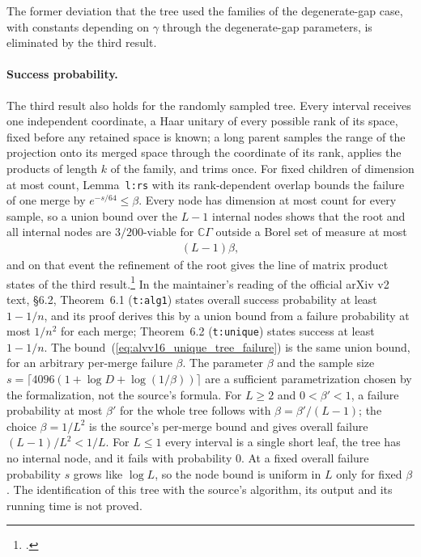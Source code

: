 \documentclass{article}
\begin{document}
The former deviation that the tree used the families of the degenerate-gap
case, with constants depending on $\gamma$ through the degenerate-gap
parameters, is eliminated by the third result.

\paragraph{Success probability.}
The third result also holds for the randomly sampled tree. Every interval
receives one independent coordinate, a Haar unitary of every possible rank
of its space, fixed before any retained space is known; a long parent
samples the range of the projection onto its merged space through the
coordinate of its rank, applies the products of length $k$ of the family,
and trims once. For fixed children of dimension at most $\mathrm{count}$,
Lemma~\texttt{l:rs} with its rank-dependent overlap bounds the failure of
one merge by $e^{-s/64}\le\beta$. Every node has dimension at most
$\mathrm{count}$ for every sample, so a union bound over the $L-1$ internal
nodes shows that the root and all internal nodes are $3/200$-viable for
$\mathbb C\Gamma$ outside a Borel set of measure at most
\begin{align}
    (L-1)\beta,
    \label{eq:alvv16_unique_tree_failure}
\end{align}
and on that event the refinement of the root gives the line of matrix
product states of the third
result.\footnote{.}
In the maintainer's reading of the official arXiv v2 text, \S6.2,
Theorem~6.1 (\texttt{t:alg1}) states overall success probability at least
$1-1/n$, and its proof derives this by a union bound from a failure
probability at most $1/n^2$ for each merge; Theorem~6.2 (\texttt{t:unique}) states success at least $1-1/n$. The
bound~(\ref{eq:alvv16_unique_tree_failure}) is the same union bound, for an arbitrary per-merge
failure $\beta$. The parameter $\beta$ and the sample size
$s=\lceil4096(1+\log D+\log(1/\beta))\rceil$ are a sufficient
parametrization chosen by the formalization, not the source's formula.
For $L\ge2$ and $0<\beta'<1$, a failure probability at most $\beta'$ for the
whole tree follows with $\beta=\beta'/(L-1)$; the choice $\beta=1/L^2$ is
the source's per-merge bound and gives overall failure $(L-1)/L^2<1/L$.
For $L\le1$ every interval is a single short leaf, the tree has no internal
node, and it fails with probability $0$. At a fixed overall failure
probability $s$ grows like $\log L$, so the node bound is uniform in $L$
only for fixed $\beta$. The identification of this tree with the source's
algorithm, its output and its running time is not proved.
\end{document}
